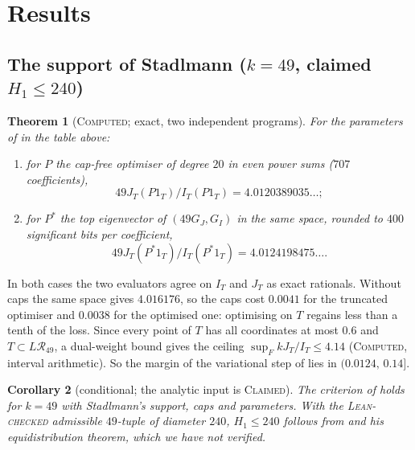\documentclass[11pt]{amsart}
\newtheorem{theorem}{Theorem}
\newtheorem{corollary}[theorem]{Corollary}
\theoremstyle{definition}
\theoremstyle{remark}
\newcommand{\lbl}[1]{\textup{\textsc{#1}}}
\newcommand{\R}{\mathcal{R}}
\begin{document}
\section{Results}

\subsection*{The support of Stadlmann ($k=49$, claimed $H_1\le240$)}

\begin{theorem}[\lbl{Computed}; exact, two independent programs]\label{thm:240}
For the parameters of \cite{Sta26} in the table above:
\begin{enumerate}
\item for $P$ the cap-free optimiser of degree $20$ in even power sums
($707$ coefficients),
\[49J_T(P1_T)/I_T(P1_T)=4.0120389035\ldots;\]
\item for $P^\ast$ the top eigenvector of $(49G_J,G_I)$ in the same space,
rounded to $400$ significant bits per coefficient,
\[49J_T(P^\ast1_T)/I_T(P^\ast1_T)=4.0124198475\ldots.\]
\end{enumerate}
\end{theorem}

In both cases the two evaluators agree on $I_T$ and $J_T$ as exact rationals.
Without caps the same space gives $4.016176$, so the caps cost $0.0041$ for the
truncated optimiser and $0.0038$ for the optimised one: optimising on $T$
regains less than a tenth of the loss. Since every point of $T$ has all
coordinates at most $0.6$ and $T\subset L\R_{49}$, a dual-weight bound gives
the ceiling $\sup_FkJ_T/I_T\le4.14$ (\lbl{Computed}, interval arithmetic). So
the margin of the variational step of \cite{Sta26} lies in $(0.0124,\,0.14]$.

\begin{corollary}[conditional; the analytic input is \lbl{Claimed}]
The criterion of \cite[Prop.~1]{Sta26} holds for $k=49$ with Stadlmann's
support, caps and parameters. With the \lbl{Lean-checked} admissible
$49$-tuple of diameter $240$, $H_1\le240$ follows from \cite[Prop.~1]{Sta26}
and his equidistribution theorem, which we have not verified.
\end{corollary}
\end{document}
